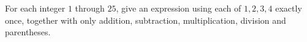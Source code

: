 For each integer $1$ through $25$, give an expression using each of $1,2,3,4$ exactly once, together with only addition, subtraction, multiplication, division and parentheses.
